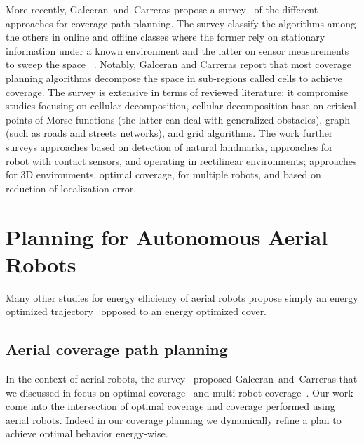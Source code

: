 More recently, Galceran~and~Carreras propose a survey~\citep{galceran2013survey} of the different approaches for coverage path planning. The survey classify the algorithms among the others in online and offline classes where the former rely on stationary information under a known environment and the latter on sensor measurements to sweep the space~\citep{galceran2013survey} . Notably, Galceran and Carreras report that most coverage planning algorithms  decompose the space in sub-regions called cells to achieve coverage. The survey is extensive in terms of reviewed literature; it compromise studies focusing on cellular decomposition, cellular decomposition base on critical points of Morse functions (the latter can deal with generalized obstacles), graph (such as roads and streets networks), and grid algorithms. The work further surveys approaches based on detection of natural landmarks, approaches for robot with contact sensors, and operating in rectilinear environments; approaches for 3D environments, optimal coverage, for multiple robots, and based on reduction of localization error. 


\section{\color{orange}Planning for Autonomous Aerial Robots}
\label{sec:soa-aerial-pl}

Many other studies for energy efficiency of aerial robots propose simply an energy optimized trajectory~\cite{morbidi2016minimum,kreciglowa2017energy} opposed to an energy optimized cover. 


\subsection{Aerial coverage path planning}
\label{sec:cov-plan-aero}

In the context of aerial robots, the survey~\citep{galceran2013survey} proposed Galceran~and~Carreras that we discussed in  focus on optimal coverage~\citep{xu2011optimal} and multi-robot coverage~\citep{ahmadzadeh2008optimization,maza2007multiple,barrientos2011aerial}. Our work come into the intersection of optimal coverage and coverage performed using aerial robots. Indeed in our coverage planning we dynamically refine a plan to achieve optimal behavior energy-wise.

